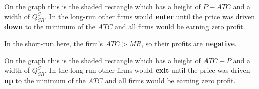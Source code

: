 \begin{question}[type=exam]{10}
{{{\begin{itemize}
{      On the graph this is the shaded rectangle which has a height of $P-ATC$ and a width of $Q_{SR}^S$.
      In the long-run other firms would \textbf{enter} until the price was driven \textbf{down} to the minimum of the $ATC$ 
      and all firms would be earning zero profit.
      }{In the short-run here, the firm's $ATC>MR$, so their profits are \textbf{negative}.

      On the graph this is the shaded rectangle which has a height of $ATC-P$ and a width of $Q_{SR}^S$.
      In the long-run other firms would \textbf{exit} until the price was driven \textbf{up} to the minimum of the $ATC$ 
      and all firms would be earning zero profit.}
    \end{itemize}
    }
  }
  }{\vspace{5cm}}

\end{question}